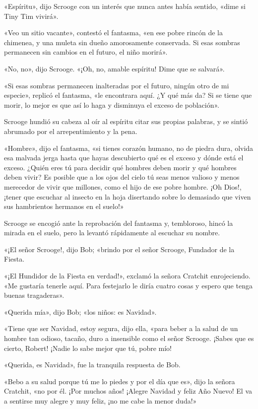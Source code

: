 \documentclass{novela}
\begin{document}
 «Espíritu», dijo Scrooge con un interés que nunca antes había sentido, «dime si Tiny Tim vivirá».

 «Veo un sitio vacante», contestó el fantasma, «en ese pobre rincón de la chimenea, y una muleta sin dueño amorosamente conservada. Si esas sombras permanecen sin cambios en el futuro, el niño morirá».

 «No, no», dijo Scrooge. «¡Oh, no, amable espíritu! Dime que se salvará».

 «Si esas sombras permanecen inalteradas por el futuro, ningún otro de mi especie», replicó el fantasma, «le encontrara aquí. ¿Y qué más da? Si se tiene que morir, lo mejor es que así lo haga y disminuya el exceso de población».

 Scrooge hundió su cabeza al oír al espíritu citar sus propias palabras, y se sintió abrumado por el arrepentimiento y la pena.

 «Hombre», dijo el fantasma, «si tienes corazón humano, no de piedra dura, olvida esa malvada jerga hasta que hayas descubierto qué es el exceso y dónde está el exceso. ¿Quién eres tú para decidir qué hombres deben morir y qué hombres deben vivir? Es posible que a los ojos del cielo tú seas menos valioso y menos merecedor de vivir que millones, como el hijo de ese pobre hombre. ¡Oh Dios!, ¡tener que escuchar al insecto en la hoja disertando sobre lo demasiado que viven sus hambrientos hermanos en el suelo!»

 Scrooge se encogió ante la reprobación del fantasma y, tembloroso, hincó la mirada en el suelo, pero la levantó rápidamente al escuchar su nombre.

 «¡El señor Scrooge!, dijo Bob; «brindo por el señor Scrooge, Fundador de la Fiesta.

 «¡El Hundidor de la Fiesta en verdad!», exclamó la señora Cratchit enrojeciendo. «Me gustaría tenerle aquí. Para festejarlo le diría cuatro cosas y espero que tenga buenas tragaderas».

 «Querida mía», dijo Bob; «los niños: es Navidad».

 «Tiene que ser Navidad, estoy segura, dijo ella, «para beber a la salud de un hombre tan odioso, tacaño, duro a insensible como el señor Scrooge. ¡Sabes que es cierto, Robert! ¡Nadie lo sabe mejor que tú, pobre mío!

 «Querida, es Navidad», fue la tranquila respuesta de Bob.

 «Bebo a su salud porque tú me lo piedes y por el día que es», dijo la señora Cratchit, «no por él. ¡Por muchos años! ¡Alegre Navidad y feliz Año Nuevo! El va a sentirse muy alegre y muy feliz, ¡no me cabe la menor duda!»
\end{document}
